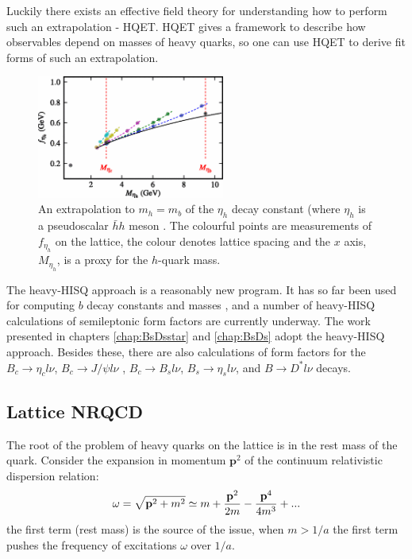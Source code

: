 Luckily there exists an effective field theory for understanding how to perform such an extrapolation - HQET. HQET gives a framework to describe how observables depend on masses of heavy quarks, so one can use HQET to derive fit forms of such an extrapolation.

\begin{figure}
  \begin{center}
    \includegraphics[width=
      0.55\textwidth]{images/fetah_heavyhisq.png}
  \end{center}
  \vspace{-5pt}
  \caption{An extrapolation to $m_h=m_b$ of the $\eta_h$ decay constant (where $\eta_h$ is a pseudoscalar $\bar{h}h$ meson \cite{McNeile:2012qf}. The colourful points are measurements of $f_{\eta_h}$ on the lattice, the colour denotes lattice spacing and the $x$ axis, $M_{\eta_h}$, is a proxy for the $h$-quark mass.}
\end{figure}

The heavy-HISQ approach is a reasonably new program. It has so far been used for computing $b$ decay constants and masses \cite{McNeile:2012qf}, and a number of heavy-HISQ calculations of semileptonic form factors are currently underway. The work presented in chapters \ref{chap:BsDsstar} and \ref{chap:BsDs} adopt the heavy-HISQ approach. Besides these, there are also calculations of form factors for the $B_c\to \eta_cl\nu$, $B_c\to J/\psi l\nu$ \cite{Lytle:2016ixw}, $B_c\to B_sl\nu$, $B_s\to \eta_sl\nu$, and $B\to D^*l\nu$ decays.

\subsection{Lattice NRQCD}

The root of the problem of heavy quarks on the lattice is in the rest mass of the quark. Consider the expansion in momentum $\textbf{p}^2$ of the continuum relativistic dispersion relation:
\begin{align}
  \omega = \sqrt{{\textbf{p}}^2 + m^2} \simeq m + {{\textbf{p}}^2\over 2m} - {{\textbf{p}}^4\over 4m^3} + ...
  \label{eq:rel_expansion}
\end{align}
the first term (rest mass) is the source of the issue, when $m > 1/a$ the first term pushes the frequency of excitations $\omega$ over $1/a$.

